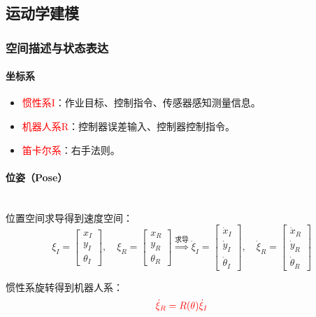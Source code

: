 \documentclass[
12pt, %
a4paper, 
oneside, %
]{scrartcl}
\begin{document}
\subsection[运动学建模]{运动学建模}
\subsubsection[空间描述与状态表达]{空间描述与状态表达}
\paragraph{坐标系}
\begin{itemize}
\item \textcolor{red}{惯性系I}：作业目标、控制指令、传感器感知测量信息。
\item \textcolor{red}{机器人系R}：控制器误差输入、控制器控制指令。
\item \textcolor{red}{笛卡尔系}：右手法则。
\end{itemize}
\paragraph{位姿（Pose）}~\\

位置空间求导得到速度空间：
$$ \xi_I = \begin{bmatrix} x_I \\ y_I \\ \theta_I \end{bmatrix}, \quad \xi_R = \begin{bmatrix} x_R \\ y_R \\ \theta_R \end{bmatrix} \overset{\text{求导}}{\Longrightarrow} \dot{\xi}_I = \begin{bmatrix} \dot{x}_I \\ \dot{y}_I \\ \dot{\theta}_I \end{bmatrix}, \quad \dot{\xi}_R = \begin{bmatrix} \dot{x}_R \\ \dot{y}_R \\ \dot{\theta}_R \end{bmatrix} $$

惯性系旋转得到机器人系：
$$ \textcolor{red}{\dot{\xi}_R = R(\theta) \dot{\xi}_I} $$
\end{document}
